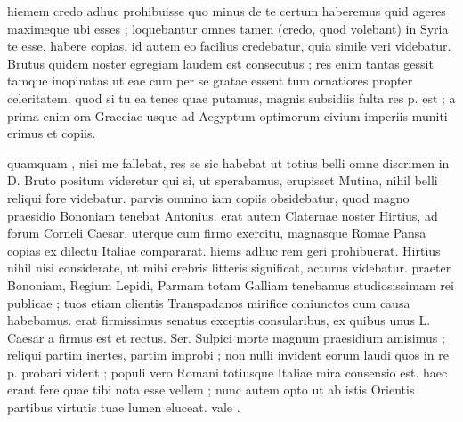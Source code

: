 


 hiemem credo adhuc prohibuisse quo minus de te certum haberemus quid ageres maximeque ubi esses ; loquebantur omnes tamen (credo, quod volebant) in Syria te esse, habere copias. id autem eo facilius credebatur, quia simile veri videbatur. Brutus quidem noster egregiam laudem est consecutus ; res enim tantas gessit tamque inopinatas ut eae cum per se gratae essent tum ornatiores propter celeritatem. quod si tu ea tenes quae putamus, magnis subsidiis fulta res p. est ; a prima enim ora Graeciae usque ad Aegyptum optimorum civium imperiis muniti erimus et copiis.

 quamquam , nisi me fallebat, res se sic habebat ut totius belli omne discrimen in D. Bruto positum videretur qui si, ut sperabamus, erupisset Mutina, nihil belli reliqui fore videbatur. parvis omnino iam copiis obsidebatur, quod magno praesidio Bononiam tenebat Antonius. erat autem Claternae noster Hirtius, ad forum Corneli Caesar, uterque cum firmo exercitu, magnasque Romae Pansa copias ex dilectu Italiae compararat. hiems adhuc rem geri prohibuerat. Hirtius nihil nisi considerate, ut mihi crebris litteris significat, acturus videbatur. praeter Bononiam, Regium Lepidi, Parmam totam Galliam tenebamus studiosissimam rei publicae ; tuos etiam clientis Transpadanos mirifice coniunctos cum causa habebamus. erat firmissimus senatus exceptis consularibus, ex quibus unus L. Caesar a firmus est et rectus. Ser. Sulpici morte magnum praesidium amisimus ; reliqui partim inertes, partim improbi ; non nulli invident eorum laudi quos in re p. probari vident ; populi vero Romani totiusque Italiae mira consensio est. haec erant fere quae tibi nota esse vellem ; nunc autem opto ut ab istis Orientis partibus virtutis tuae lumen eluceat. vale .
